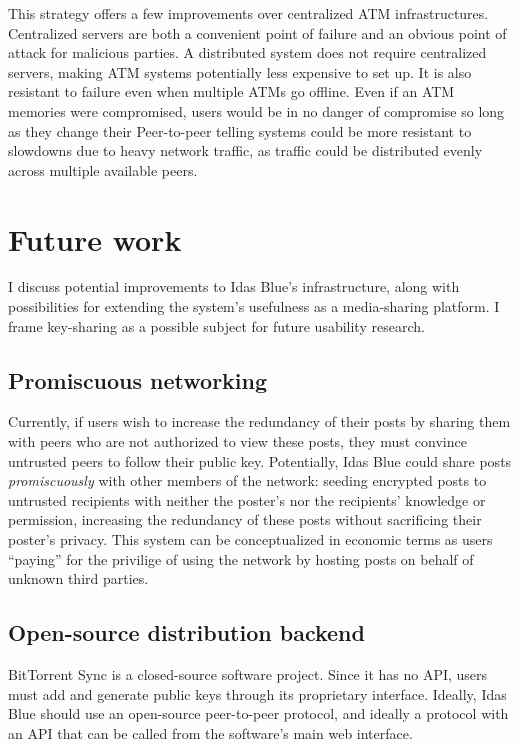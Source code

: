 \documentclass{article}
\begin{document}
This strategy offers a few improvements over centralized ATM infrastructures. Centralized servers are both a convenient point of failure and an obvious point of attack for malicious parties. A distributed system does not require centralized servers, making ATM systems potentially less expensive to set up. It is also resistant to failure even when multiple ATMs go offline. Even if an ATM memories were compromised, users would be in no danger of compromise so long as they change their  Peer-to-peer telling systems could be more resistant to slowdowns due to heavy network traffic, as traffic could be distributed evenly across multiple available peers.

\section{Future work}
I discuss potential improvements to Idas Blue's infrastructure, along with possibilities for extending the system's usefulness as a media-sharing platform. I frame key-sharing as a possible subject for future usability research.

\subsection{Promiscuous networking}
Currently, if users wish to increase the redundancy of their posts by sharing them with peers who are not authorized to view these posts, they must convince untrusted peers to follow their public key. Potentially, Idas Blue could share posts \textit{promiscuously} with other members of the network: seeding encrypted posts to untrusted recipients with neither the poster's nor the recipients' knowledge or permission, increasing the redundancy of these posts without sacrificing their poster's privacy. This system can be conceptualized in economic terms as users ``paying'' for the privilige of using the network by hosting posts on behalf of unknown third parties.

\subsection{Open-source distribution backend}
BitTorrent Sync is a closed-source software project. Since it has no API, users must add and generate public keys through its proprietary interface. Ideally, Idas Blue should use an open-source peer-to-peer protocol, and ideally a protocol with an API that can be called from the software's main web interface.
\end{document}
